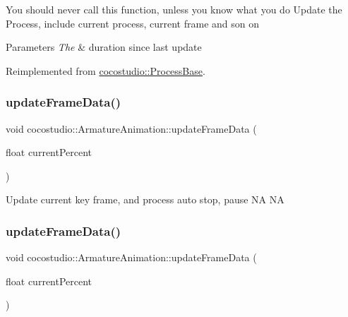 You should never call this function, unless you know what you do Update the Process, include current process, current frame and son on


\begin{DoxyParams}{Parameters}
{\em The} & duration since last update \\
\hline
\end{DoxyParams}


Reimplemented from \hyperlink{classcocostudio_1_1ProcessBase_acd596d27542d92de41e3435add6f7399}{cocostudio\+::\+Process\+Base}.

\mbox{\label{classcocostudio_1_1ArmatureAnimation_ae4f82be17f0c1612d0d5fca27d8698dc}} 
\subsubsection{\texorpdfstring{update\+Frame\+Data()}{updateFrameData()}\hspace{0.1cm}{\footnotesize\ttfamily [1/2]}}
{\footnotesize\ttfamily void cocostudio\+::\+Armature\+Animation\+::update\+Frame\+Data (\begin{DoxyParamCaption}\item[{float}]{current\+Percent }\end{DoxyParamCaption})\hspace{0.3cm}{\ttfamily [protected]}}

Update current key frame, and process auto stop, pause  NA  NA \mbox{\label{classcocostudio_1_1ArmatureAnimation_ae4f82be17f0c1612d0d5fca27d8698dc}} 
\subsubsection{\texorpdfstring{update\+Frame\+Data()}{updateFrameData()}\hspace{0.1cm}{\footnotesize\ttfamily [2/2]}}
{\footnotesize\ttfamily void cocostudio\+::\+Armature\+Animation\+::update\+Frame\+Data (\begin{DoxyParamCaption}\item[{float}]{current\+Percent }\end{DoxyParamCaption})\hspace{0.3cm}{\ttfamily [protected]}}

